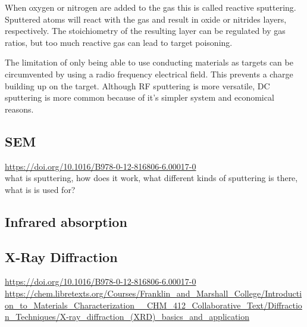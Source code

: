 When oxygen or nitrogen are added to the  gas this is called reactive sputtering.
Sputtered atoms will react with the gas and result in oxide or nitrides layers, respectively.
The stoichiometry of the resulting layer can be regulated by gas ratios, but too much reactive gas can lead to target poisoning.

The limitation of only being able to use conducting materials as targets can be circumvented by using a radio frequency electrical field. 
This prevents a charge building up on the target. 
Although RF sputtering is more versatile, DC sputtering is more common because of it's simpler system and economical reasons.

\subsection{SEM}
\url{https://doi.org/10.1016/B978-0-12-816806-6.00017-0}\\
what is sputtering, 
how does it work, 
what different kinds of sputtering is there, 
what is is used for? 
\cite{McMullan1995}
\cite{Vernon2000}
\cite{Kaliva2020}


\subsection{Infrared absorption}
\subsection{X-Ray Diffraction}
\url{https://doi.org/10.1016/B978-0-12-816806-6.00017-0}\\
\url{https://chem.libretexts.org/Courses/Franklin_and_Marshall_College/Introduction_to_Materials_Characterization__CHM_412_Collaborative_Text/Diffraction_Techniques/X-ray_diffraction_(XRD)_basics_and_application}\\
